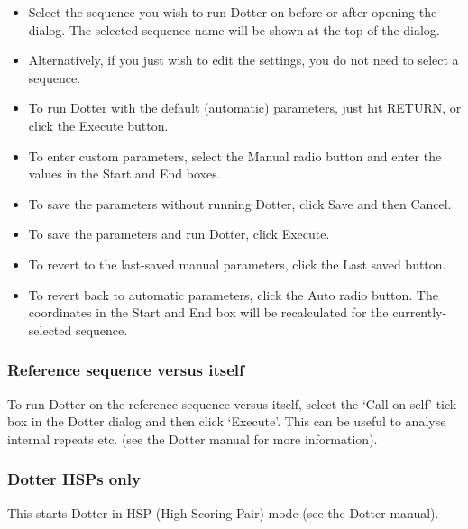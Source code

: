 \documentclass[letterpaper]{article}
\newcommand\liststyleWWviiiNumxxxvii{%
\renewcommand\labelitemi{{\textbullet}}
\renewcommand\labelitemii{o}
\renewcommand\labelitemiii{[F0A7?]}
\renewcommand\labelitemiv{[F0B7?]}
}
\begin{document}
\liststyleWWviiiNumxxxvii
\begin{itemize}
\item {Select the sequence you wish to run Dotter on before or after opening the dialog. The selected sequence name will be shown at the top of the dialog.}
\item {Alternatively, if you just wish to edit the settings, you do not need to select a sequence.}
\item {To run Dotter with the default (automatic) parameters, just hit RETURN, or click the {\textquotesingle}Execute{\textquotesingle} button.}
\item {To enter custom parameters, select the {\textquotesingle}Manual{\textquotesingle} radio button and enter the values in the {\textquotesingle}Start{\textquotesingle} and {\textquotesingle}End{\textquotesingle} boxes.}
\item {To save the parameters without running Dotter, click Save and then Cancel{\textquotesingle}.}
\item {To save the parameters and run Dotter, click {\textquotesingle}Execute{\textquotesingle}.}
\item {To revert to the last-saved manual parameters, click the {\textquotesingle}Last saved{\textquotesingle} button.}
\item {To revert back to automatic parameters, click the {\textquotesingle}Auto{\textquotesingle} radio button. The coordinates in the Start and End box will be recalculated for the currently-selected sequence.}
\end{itemize}
{\color[rgb]{0.30980393,0.5058824,0.7411765}\subsubsection[Reference sequence versus itself]{Reference sequence versus itself}}
\hypertarget{RefHeading2181056909880}{}
To run Dotter on the reference sequence versus itself, select the {\textquoteleft}Call on self{\textquoteright} tick box in the Dotter dialog and then click {\textquoteleft}Execute{\textquoteright}. This can be useful to analyse internal repeats etc. (see the Dotter manual for more information).

\bigskip

{\color[rgb]{0.30980393,0.5058824,0.7411765}\subsubsection[Dotter HSPs only]{Dotter HSPs only}}
\hypertarget{RefHeading2201056909880}{}{
This starts Dotter in HSP (High-Scoring Pair) mode (see the Dotter
manual).}
\end{document}
